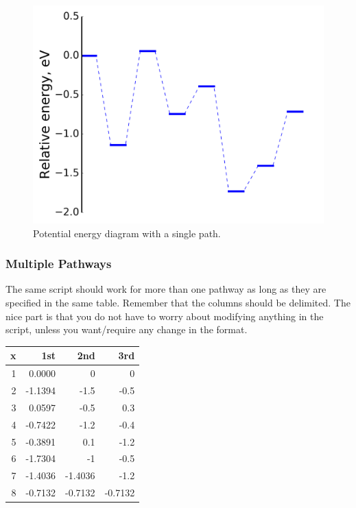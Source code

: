 \documentclass[11pt]{article}
\begin{document}
\begin{figure}[htbp]
\centering
\includegraphics[width=.9\linewidth]{./figures/PED_singlepath.png}
\caption{Potential energy diagram with a single path.}
\end{figure}

\subsubsection{Multiple Pathways}
\label{sec:orge3edea1}
The same script should work for more than one pathway as long as they are specified in the same table. Remember that the columns should be delimited. The nice part is that you do not have to worry about modifying anything in the script, unless you want/require any change in the format.

\begin{center}
\label{tab:org0c81b29}
\begin{tabular}{rrrr}
x & 1st & 2nd & 3rd\\
\hline
1 & 0.0000 & 0 & 0\\
2 & -1.1394 & -1.5 & -0.5\\
3 & 0.0597 & -0.5 & 0.3\\
4 & -0.7422 & -1.2 & -0.4\\
5 & -0.3891 & 0.1 & -1.2\\
6 & -1.7304 & -1 & -0.5\\
7 & -1.4036 & -1.4036 & -1.2\\
8 & -0.7132 & -0.7132 & -0.7132\\
\end{tabular}
\end{center}
\end{document}

